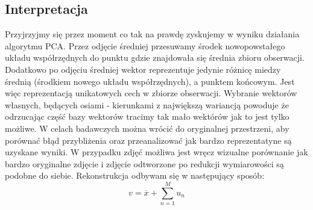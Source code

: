 \documentclass[oneside, eng]{mgr}
\begin{document}
\subsection{Interpretacja}
Przyjrzyjmy się przez moment co tak na prawdę zyskujemy w wyniku działania algorytmu PCA. Przez odjęcie średniej przesuwamy środek nowopowstałego układu współrzędnych do punktu gdzie znajdowała się średnia zbioru obserwacji. Dodatkowo po odjęciu średniej wektor reprezentuje jedynie różnicę miedzy średnią (środkiem nowego układu współrzędnych), a punktem końcowym. Jest więc reprezentacją unikatowych cech w zbiorze obserwacji. Wybranie wektorów własnych, będących osiami - kierunkami z największą wariancją powoduje że odrzucając część bazy wektorów tracimy tak mało wektórów jak to jest tylko możliwe. W celach badawczych można wrócić do oryginalnej przestrzeni, aby porównać błąd przybliżenia oraz przeanalizować jak bardzo reprezentatyne są uzyskane wyniki. W przypadku zdjęć możliwa jest wręcz wizualne porównanie jak bardzo oryginalne zdjęcie i zdjęcie odtworzone po redukcji wymiarowości są podobne do siebie. Rekonstrukcja odbywam się w następujący sposób:
\begin{equation}
	v = \overline{x} + \sum_{n=1}^{M}u_n
\end{equation}
\end{document}
